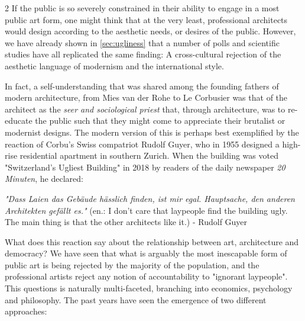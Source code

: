 \documentclass{article}
\begin{document}
\begin{multicols}{2}
If the public is so severely constrained in their ability to engage in a most public art form, one might think that at the very least, professional architects would design according to the aesthetic needs, or desires of the public. However, we have already shown in \cref{sec:ugliness} that a number of polls and scientific studies have all replicated the same finding: A cross-cultural rejection of the aesthetic language of modernism and the international style. 

In fact, a self-understanding that was shared among the founding fathers of modern architecture, from Mies van der Rohe to Le Corbusier was that of the architect as the \textit{seer and sociological priest} \cite[Sec. 4]{hughes_shock_1993} that, through architecture, was to re-educate the public such that they might come to appreciate their brutalist or modernist designs. The modern version of this is perhaps best exemplified by the reaction of Corbu's Swiss compatriot Rudolf Guyer, who in 1955 designed a high-rise residential apartment in southern Zurich. When the building was voted "Switzerland's Ugliest Building" in 2018 by readers of the daily newspaper \textit{20 Minuten}, he declared:

\textit{"Dass Laien das Gebäude hässlich finden, ist mir egal. Hauptsache, den anderen Architekten gefällt es."} (en.: I don't care that laypeople find the building ugly. The main thing is that the other architects like it.) - Rudolf Guyer \cite{noauthor_architekt_2018}



What does this reaction say about the relationship between art, architecture and democracy? We have seen that what is arguably the most inescapable form of public art is being rejected by the majority of the population, and the professional artists reject any notion of accountability to "ignorant laypeople". This questions is naturally multi-faceted, branching into economics, psychology and philosophy. The past years have seen the emergence of two different approaches:


\end{multicols}
\end{document}
